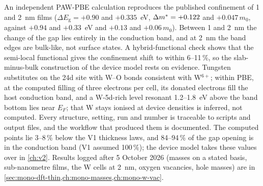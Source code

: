 \begin{keyresult}
An independent PAW-PBE calculation reproduces the published confinement of 1 and 2~nm \InO{} films ($\Delta
E_{\mathrm{g}} = +0.90$ and $+0.335$~eV, $\Delta m^{*} = +0.122$ and $+0.047\,m_0$, against $+0.94$ and $+0.33$~eV and
$+0.13$ and $+0.06\,m_0$). Between 1 and 2~nm the change of the gap lies entirely in the conduction band, and at 2~nm the band
edges are bulk-like, not surface states. A hybrid-functional check shows that the
semi-local functional gives the confinement shift to within 6--11\,\%, so the slab-minus-bulk construction of the device
model rests on evidence. Tungsten substitutes on the 24d site with W--O bonds consistent with W$^{6+}$; within PBE, at the computed filling of
three electrons per cell, its donated electrons fill the host conduction band, and a W-5d-rich level resonant
1.2--1.8~eV above the band bottom lies near $E_F$; that W stays ionised at device densities is inferred, not computed. Every structure, setting, run and number is traceable to scripts and output files,
and the workflow that produced them is documented. The computed points lie 3--8\,\% below the V1 thickness laws, and 84--94\,\%
of the gap opening is in the conduction band (V1 assumed 100\,\%); the device model takes these values over in
\cref{ch:v2}. Results logged after 5 October 2026 (masses on a stated basis, sub-nanometre films, the W cells at
2~nm, oxygen vacancies, hole masses) are in \cref{sec:mono-dft-thin,ch:mono-masses,ch:mono-w-vac}.
\end{keyresult}
